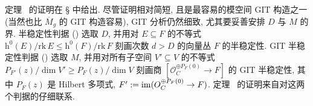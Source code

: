 定理~ 的证明在 \S{} 中给出. 尽管证明相对简短, 且是最容易的模空间 GIT 构造之一 (当然也比 $\overline M_g$ 的 GIT 构造容易), GIT 分析仍然细致, 尤其要妥善安排 $D$ 与 $M$ 的界. 半稳定性判据 () 选取 $D$, 并用对 $E\subseteq F$ 的不等式 $\mathrm h^0(E)/\mathrm{rk}\,E\leq\mathrm h^0(F)/\mathrm{rk}\,F$ 刻画次数 $d>D$ 的向量丛 $F$ 的半稳定性. GIT 半稳定性判据 () 选取 $M$, 并用对所有子空间 $V'\subseteq V$ 的不等式 $P_{F'}(z)/\dim V'\geq P_F(z)/\dim V$ 刻画商 $[\mathcal O_C^{\oplus P_F(0)}\to F]$ 的 GIT 半稳定性, 其中 $P_F(z)$ 是 Hilbert 多项式, $F':=\operatorname{im}(O_C^{\oplus P_F(0)}\to F)$. 定理~ 的证明来自对这两个判据的仔细联系.
